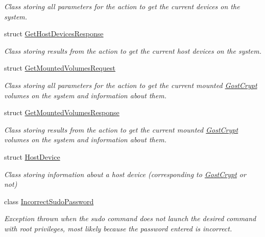 \begin{DoxyCompactItemize}
\begin{DoxyCompactList}\small\item\em Class storing all parameters for the action to get the current devices on the system. \end{DoxyCompactList}\item 
struct \hyperlink{struct_gost_crypt_1_1_core_1_1_get_host_devices_response}{Get\+Host\+Devices\+Response}
\begin{DoxyCompactList}\small\item\em Class storing results from the action to get the current host devices on the system. \end{DoxyCompactList}\item 
struct \hyperlink{struct_gost_crypt_1_1_core_1_1_get_mounted_volumes_request}{Get\+Mounted\+Volumes\+Request}
\begin{DoxyCompactList}\small\item\em Class storing all parameters for the action to get the current mounted \hyperlink{namespace_gost_crypt}{Gost\+Crypt} volumes on the system and information about them. \end{DoxyCompactList}\item 
struct \hyperlink{struct_gost_crypt_1_1_core_1_1_get_mounted_volumes_response}{Get\+Mounted\+Volumes\+Response}
\begin{DoxyCompactList}\small\item\em Class storing results from the action to get the current mounted \hyperlink{namespace_gost_crypt}{Gost\+Crypt} volumes on the system and information about them. \end{DoxyCompactList}\item 
struct \hyperlink{struct_gost_crypt_1_1_core_1_1_host_device}{Host\+Device}
\begin{DoxyCompactList}\small\item\em Class storing information about a host device (corresponding to \hyperlink{namespace_gost_crypt}{Gost\+Crypt} or not) \end{DoxyCompactList}\item 
class \hyperlink{class_gost_crypt_1_1_core_1_1_incorrect_sudo_password}{Incorrect\+Sudo\+Password}
\begin{DoxyCompactList}\small\item\em Exception thrown when the sudo command does not launch the desired command with root privileges, most likely because the password entered is incorrect. \end{DoxyCompactList}\item 

\end{DoxyCompactItemize}
